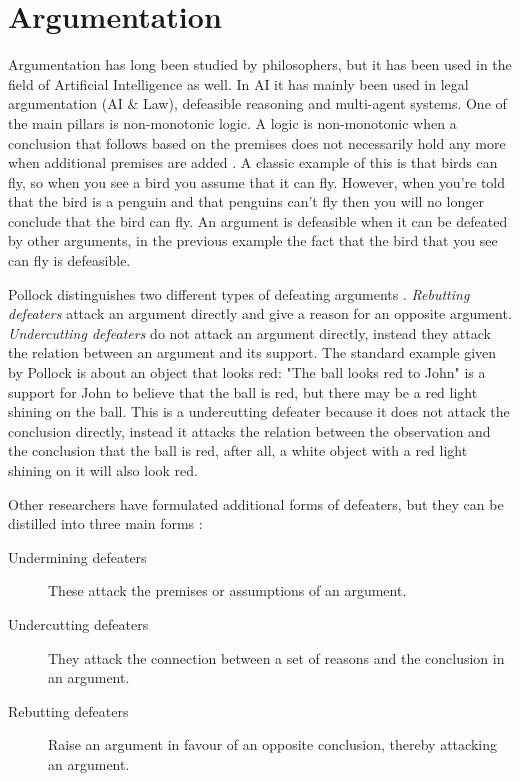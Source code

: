 \documentclass[a4paper]{article}
\begin{document}
\section{Argumentation}
Argumentation has long been studied by philosophers, but it has been used in
the field of Artificial Intelligence as well. In AI it has mainly been used in
legal argumentation (AI \& Law), defeasible reasoning and multi-agent systems.
One of the main pillars is non-monotonic logic. A logic is non-monotonic when a
conclusion that follows based on the premises does not necessarily hold any
more when additional premises are added \cite{vaneemeren2014}. A classic
example of this is that birds can fly, so when you see a bird you assume that
it can fly. However, when you're told that the bird is a penguin and that
penguins can't fly then you will no longer conclude that the bird can fly. An
argument is defeasible when it can be defeated by other arguments, in the
previous example the fact that the bird that you see can fly is defeasible.

Pollock distinguishes two different types of defeating arguments
\cite{pollock1995}. \emph{Rebutting defeaters} attack an argument directly and
give a reason for an opposite argument. \emph{Undercutting defeaters} do not
attack an argument directly, instead they attack the relation between an
argument and its support. The standard example given by Pollock is about an
object that looks red: "The ball looks red to John" is a support for John to
believe that the ball is red, but there may be a red light shining on the ball.
This is a undercutting defeater because it does not attack the conclusion
directly, instead it attacks the relation between the observation and the
conclusion that the ball is red, after all, a white object with a red light
shining on it will also look red.

Other researchers have formulated additional forms of defeaters, but they can
be distilled into three main forms \cite{vaneemeren2014}:
\begin{description}
	\item[Undermining defeaters] These attack the premises or assumptions of an
	argument.
	\item[Undercutting defeaters] They attack the connection between a set of
	reasons and the conclusion in an argument.
	\item[Rebutting defeaters] Raise an argument in favour of an opposite
	conclusion, thereby attacking an argument.
\end{description}
\end{document}
